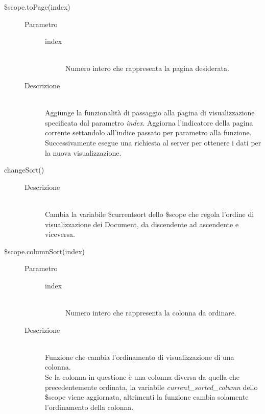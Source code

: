\begin{description}
\begin{description}
  \item[\$scope.toPage(index)] \hfill
  \begin{description}
  	\item[Parametro] \hfill
  		\begin{description}
  			\item[index] \hfill \\
  			Numero intero che rappresenta la pagina desiderata.
       \end{description}
  	\item[Descrizione] \hfill \\
       Aggiunge la funzionalità di passaggio alla pagina di visualizzazione specificata dal parametro \textit{index}. Aggiorna l'indicatore della pagina corrente settandolo all'indice passato per parametro alla funzione. Successivamente esegue una richiesta al server per ottenere i dati per la nuova visualizzazione.
    \end{description}
    

  \item[changeSort()] \hfill
    \begin{description}
  	\item[Descrizione] \hfill \\
  Cambia la variabile \$current\textunderscore sort dello \$scope che regola l'ordine di visualizzazione dei Document, da discendente ad ascendente e viceversa.
      \end{description}

  \item[\$scope.columnSort(index)] \hfill
  \begin{description}
  	\item[Parametro] \hfill
  		\begin{description}
  			\item[index] \hfill \\
  			Numero intero che rappresenta la colonna da ordinare.
       \end{description}
  	\item[Descrizione] \hfill \\
        Funzione che cambia l'ordinamento di visualizzazione di una colonna. \\
  Se la colonna in questione è una colonna diversa da quella che precedentemente ordinata, la variabile \textit{current\_sorted\_column} dello \$scope viene aggiornata, altrimenti la funzione cambia solamente
  l'ordinamento della colonna.
    \end{description}


\end{description}
\end{description}
